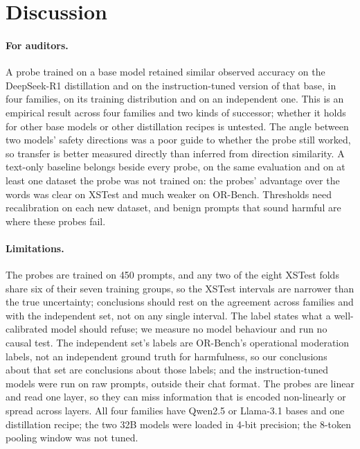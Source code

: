 \documentclass[10pt]{article}
\begin{document}
\section{Discussion}
\label{sec:discussion}

\paragraph{For auditors.} A probe trained on a base model retained similar observed accuracy on the DeepSeek-R1 distillation and on the instruction-tuned version of that base, in four families, on its training distribution and on an independent one. This is an empirical result across four families and two kinds of successor; whether it holds for other base models or other distillation recipes is untested. The angle between two models' safety directions was a poor guide to whether the probe still worked, so transfer is better measured directly than inferred from direction similarity. A text-only baseline belongs beside every probe, on the same evaluation and on at least one dataset the probe was not trained on: the probes' advantage over the words was clear on XSTest and much weaker on OR-Bench. Thresholds need recalibration on each new dataset, and benign prompts that sound harmful are where these probes fail.

\paragraph{Limitations.} The probes are trained on 450 prompts, and any two of the eight XSTest folds share six of their seven training groups, so the XSTest intervals are narrower than the true uncertainty; conclusions should rest on the agreement across families and with the independent set, not on any single interval. The label states what a well-calibrated model should refuse; we measure no model behaviour and run no causal test. The independent set's labels are OR-Bench's operational moderation labels, not an independent ground truth for harmfulness, so our conclusions about that set are conclusions about those labels; and the instruction-tuned models were run on raw prompts, outside their chat format. The probes are linear and read one layer, so they can miss information that is encoded non-linearly or spread across layers. All four families have Qwen2.5 or Llama-3.1 bases and one distillation recipe; the two 32B models were loaded in 4-bit precision; the 8-token pooling window was not tuned.
\end{document}
